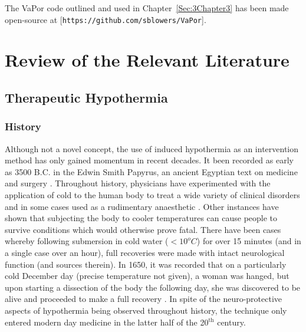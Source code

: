 \documentclass[11pt,english,a4paper,twoside,openright]{report}
\begin{document}
{{{{{{{{	The VaPor code outlined and used in Chapter~\ref{Sec:3Chapter3} has been made open-source at [\texttt{https://github.com/sblowers/VaPor}].
	
	\newpage
	\thispagestyle{empty}
	\setcounter{chapter}{1}
	\chapter[Review of the Relevant Literature]{{\Huge R}eview of the {\Huge R}elevant {\Huge L}iterature}
	\thispagestyle{empty}
	\label{Sec:1Chapter1}
	
	\section[Therapeutic Hypothermia]{{\Large T}herapeutic {\Large H}ypothermia}
	
	\subsection{History}
	
	Although not a novel concept, the use of induced hypothermia as an intervention method has only gained momentum in recent decades. It been recorded as early as 3500 {B.C.} in the Edwin Smith Papyrus, an ancient Egyptian text on medicine and surgery \cite{wang2006cold}. Throughout history, physicians have experimented with the application of cold to the human body to treat a wide variety of clinical disorders and in some cases used as a rudimentary anaesthetic \cite{karnatovskaia2014therapeutic}. Other instances have shown that subjecting the body to cooler temperatures can cause people to survive conditions which would otherwise prove fatal. There have been cases whereby following submersion in cold water (${<}10^{o}C$) for over 15 minutes (and in a single case over an hour), full recoveries were made with intact neurological function \cite{bolte1988use} (and sources therein). In 1650, it was recorded that on a particularly cold December day (precise temperature not given), a woman was hanged, but upon starting a dissection of the body the following day, she was discovered to be alive and proceeded to make a full recovery \cite{breathnach2009intensive}. In spite of the neuro-protective aspects of hypothermia being observed throughout history, the technique only entered modern day medicine in the latter half of the 20$^{\text{th}}$ century.
	
}}}}}}}}
\end{document}
